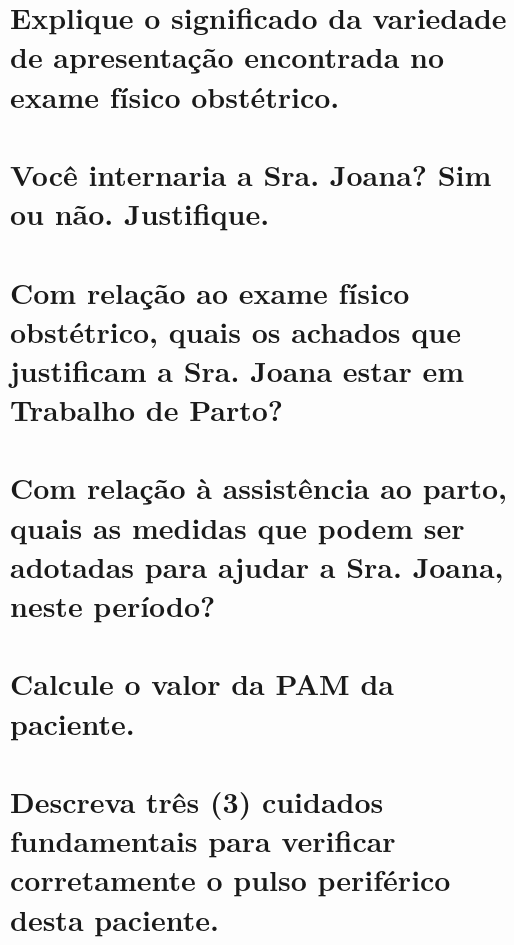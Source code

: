 \documentclass[11pt,notitlepage]{article}
\begin{document}
\section{Explique o significado da variedade de apresentação encontrada no exame físico obstétrico.}
\noindent\makebox[\linewidth]{\rule{\textwidth}{0.5pt}}
\noindent\makebox[\linewidth]{\rule{\textwidth}{0.5pt}}
\noindent\makebox[\linewidth]{\rule{\textwidth}{0.5pt}}
\vspace{0.5cm}

\section{Você internaria a Sra. Joana? Sim ou não. Justifique.}
\noindent\makebox[\linewidth]{\rule{\textwidth}{0.5pt}}
\noindent\makebox[\linewidth]{\rule{\textwidth}{0.5pt}}
\noindent\makebox[\linewidth]{\rule{\textwidth}{0.5pt}}
\vspace{0.5cm}

\section{Com relação ao exame físico obstétrico, quais os achados que justificam a Sra. Joana estar em Trabalho de Parto?}
\noindent\makebox[\linewidth]{\rule{\textwidth}{0.5pt}}
\noindent\makebox[\linewidth]{\rule{\textwidth}{0.5pt}}
\vspace{0.5cm}

\section{Com relação à assistência ao parto, quais as medidas que podem ser adotadas para ajudar a Sra. Joana, neste período?}
\noindent\makebox[\linewidth]{\rule{\textwidth}{0.5pt}}
\noindent\makebox[\linewidth]{\rule{\textwidth}{0.5pt}}
\noindent\makebox[\linewidth]{\rule{\textwidth}{0.5pt}}
\vspace{0.5cm}

\section{Calcule o valor da PAM da paciente. }
\noindent\makebox[\linewidth]{\rule{\textwidth}{0.5pt}}
\noindent\makebox[\linewidth]{\rule{\textwidth}{0.5pt}}
\noindent\makebox[\linewidth]{\rule{\textwidth}{0.5pt}}
\noindent\makebox[\linewidth]{\rule{\textwidth}{0.5pt}}
\vspace{0.5cm}

\section{Descreva três (3) cuidados fundamentais para verificar corretamente o pulso periférico desta paciente.}
\noindent\makebox[\linewidth]{\rule{\textwidth}{0.5pt}}
\noindent\makebox[\linewidth]{\rule{\textwidth}{0.5pt}}
\noindent\makebox[\linewidth]{\rule{\textwidth}{0.5pt}}
\noindent\makebox[\linewidth]{\rule{\textwidth}{0.5pt}}
\noindent\makebox[\linewidth]{\rule{\textwidth}{0.5pt}}
\noindent\makebox[\linewidth]{\rule{\textwidth}{0.5pt}}
\vspace{0.5cm}

\end{document}
